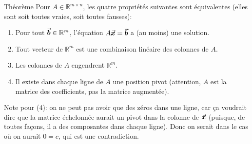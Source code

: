 \documentclass{article}
\begin{document}
\begin{parag}{Théorème}
    Pour $A \in \mathbb{R}^{m \times n}$, les quatre propriétés suivantes sont équivalentes (elles sont soit toutes vraies, soit toutes fausses):
    \begin{enumerate}
        \item Pour tout $\bm{\protect\vec{b}} \in \mathbb{R}^m$, l'équation $A \bm{\protect\vec{x}} = \bm{\protect\vec{b}}$ a (au moins) une solution.
        \item Tout vecteur de $\mathbb{R}^m$ est une combinaison linéaire des colonnes de $A$.
        \item Les colonnes de $A$ engendrent $\mathbb{R}^{m}$.
        \item Il existe dans chaque ligne de $A$ une position pivot (attention, $A$ est la matrice des coefficients, pas la matrice augmentée).
    \end{enumerate}


    Note pour (4): on ne peut pas avoir que des zéros dans une ligne, car ça voudrait dire que la matrice échelonnée aurait un pivot dans la colonne de $\bm{\protect\vec{x}}$ (puisque, de toutes façons, il a des composantes dans chaque ligne). Donc on serait dans le cas où on aurait $0 = c$, qui est une contradiction.
\end{parag}
\end{document}
